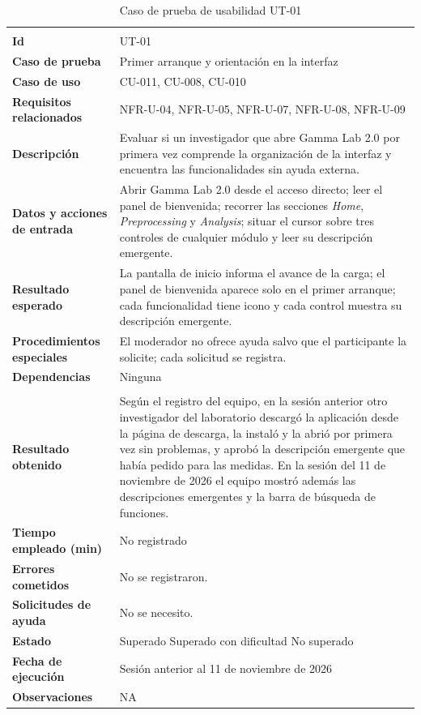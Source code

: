 \documentclass[12pt,letterpaper,oneside]{article}
\DeclareRobustCommand{\_}{\textunderscore\allowbreak}
\newcommand{\fechasesion}{11 de noviembre de 2026}
\newcommand{\casilla}[1]{%
    \fbox{\makebox[1em][c]{#1}}%
}
\begin{document}
\begin{center}
\small
\begin{longtable}{|>{\raggedright\arraybackslash}p{}|>{\raggedright\arraybackslash}p{}|}
\hline
\endfirsthead
\hline
\endhead
\hline
\endfoot
\hline
\caption{Caso de prueba de usabilidad UT-01} \label{tab:ut-01} \\
\endlastfoot
\textbf{Id} & UT-01 \\
\hline
\textbf{Caso de prueba} & Primer arranque y orientación en la interfaz \\
\hline
\textbf{Caso de uso} & CU-011, CU-008, CU-010 \\
\hline
\textbf{Requisitos relacionados} & NFR-U-04, NFR-U-05, NFR-U-07, NFR-U-08, NFR-U-09 \\
\hline
\textbf{Descripción} & Evaluar si un investigador que abre Gamma Lab 2.0 por primera vez comprende la organización de la interfaz y encuentra las funcionalidades sin ayuda externa. \\
\hline
\textbf{Datos y acciones de entrada} & Abrir Gamma Lab 2.0 desde el acceso directo; leer el panel de bienvenida; recorrer las secciones \textit{Home}, \textit{Preprocessing} y \textit{Analysis}; situar el cursor sobre tres controles de cualquier módulo y leer su descripción emergente. \\
\hline
\textbf{Resultado esperado} & La pantalla de inicio informa el avance de la carga; el panel de bienvenida aparece solo en el primer arranque; cada funcionalidad tiene icono y cada control muestra su descripción emergente. \\
\hline
\textbf{Procedimientos especiales} & El moderador no ofrece ayuda salvo que el participante la solicite; cada solicitud se registra. \\
\hline
\textbf{Dependencias} & Ninguna \\
\hline
\multicolumn{2}{|c|}{\textbf{Información para el seguimiento}} \\
\hline
\textbf{Resultado obtenido} & Según el registro del equipo, en la sesión anterior otro investigador del laboratorio descargó la aplicación desde la página de descarga, la instaló y la abrió por primera vez sin problemas, y aprobó la descripción emergente que había pedido para las medidas. En la sesión del \fechasesion{} el equipo mostró además las descripciones emergentes y la barra de búsqueda de funciones. \\
\hline
\textbf{Tiempo empleado (min)} & No registrado \\
\hline
\textbf{Errores cometidos} & No se registraron. \\
\hline
\textbf{Solicitudes de ayuda} & No se necesito. \\
\hline
\textbf{Estado} & \casilla{x} Superado \qquad \casilla{} Superado con dificultad \qquad \casilla{} No superado \\
\hline
\textbf{Fecha de ejecución} & Sesión anterior al \fechasesion{} \\
\hline
\textbf{Observaciones} & NA \\
\hline
\end{longtable}
\end{center}
\end{document}
